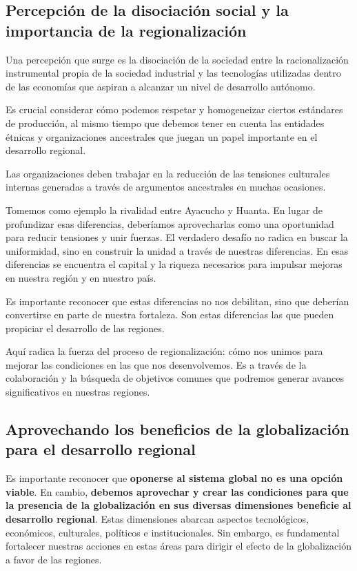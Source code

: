 \documentclass[
  jou,
  floatsintext,
  longtable,
  a4paper,
  nolmodern,
  notxfonts,
  notimes,
  12pt,
  colorlinks=true,linkcolor=blue,citecolor=blue,urlcolor=blue]{apa7}
\begin{document}
\subsection{Percepción de la disociación social y la importancia de la
regionalización}\label{percepciuxf3n-de-la-disociaciuxf3n-social-y-la-importancia-de-la-regionalizaciuxf3n}

Una percepción que surge es la disociación de la sociedad entre la
racionalización instrumental propia de la sociedad industrial y las
tecnologías utilizadas dentro de las economías que aspiran a alcanzar un
nivel de desarrollo autónomo.

Es crucial considerar cómo podemos respetar y homogeneizar ciertos
estándares de producción, al mismo tiempo que debemos tener en cuenta
las entidades étnicas y organizaciones ancestrales que juegan un papel
importante en el desarrollo regional.

Las organizaciones deben trabajar en la reducción de las tensiones
culturales internas generadas a través de argumentos ancestrales en
muchas ocasiones.

Tomemos como ejemplo la rivalidad entre Ayacucho y Huanta. En lugar de
profundizar esas diferencias, deberíamos aprovecharlas como una
oportunidad para reducir tensiones y unir fuerzas. El verdadero desafío
no radica en buscar la uniformidad, sino en construir la unidad a través
de nuestras diferencias. En esas diferencias se encuentra el capital y
la riqueza necesarios para impulsar mejoras en nuestra región y en
nuestro país.

Es importante reconocer que estas diferencias no nos debilitan, sino que
deberían convertirse en parte de nuestra fortaleza. Son estas
diferencias las que pueden propiciar el desarrollo de las regiones.

Aquí radica la fuerza del proceso de regionalización: cómo nos unimos
para mejorar las condiciones en las que nos desenvolvemos. Es a través
de la colaboración y la búsqueda de objetivos comunes que podremos
generar avances significativos en nuestras regiones.

\subsection{Aprovechando los beneficios de la globalización para el
desarrollo
regional}\label{aprovechando-los-beneficios-de-la-globalizaciuxf3n-para-el-desarrollo-regional}

Es importante reconocer que \textbf{oponerse al sistema global no es una
opción viable}. En cambio, \textbf{debemos aprovechar y crear las
condiciones para que la presencia de la globalización en sus diversas
dimensiones beneficie al desarrollo regional}. Estas dimensiones abarcan
aspectos tecnológicos, económicos, culturales, políticos e
institucionales. Sin embargo, es fundamental fortalecer nuestras
acciones en estas áreas para dirigir el efecto de la globalización a
favor de las regiones.
\end{document}
